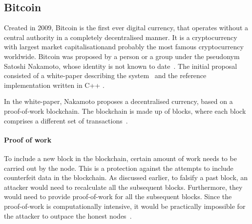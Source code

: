 \subsection{Bitcoin}
% 
Created in 2009, Bitcoin is the first ever digital currency, that operates without a central authority in a completely decentralised manner. It is a cryptocurrency with largest market capitalisation\footnotemark and probably the most famous cryptocurrency worldwide.
% 
% 
Bitcoin was proposed by a person or a group under the pseudonym Satoshi Nakamoto, whose identity is not known to date~\cite{Feins2017SatoshiBitcoin}. The initial proposal consisted of a white-paper describing the system~\cite{NakamotoBitcoin:System} and the reference implementation written in  C++ \footnotemark.
% 

In the white-paper, Nakamoto proposes a decentralised currency, based on a proof-of-work blockchain. The blockchain is made up of blocks, where each block comprises a different set of transactions~\cite{Decker2013InformationNetwork, Judmayer2017BlocksMechanisms}.

\paragraph{Proof of work}
To include a new block in the blockchain, certain amount of work needs to be carried out by the node. This is a protection against the attempts to include counterfeit data in the blockchain. As discussed earlier, to falsify a past block, an attacker would need to recalculate all the subsequent blocks. Furthermore, they would need to provide proof-of-work for all the subsequent blocks. Since the proof-of-work is computationally intensive, it would be practically impossible for the attacker to outpace the honest nodes~\cite{NakamotoBitcoin:System}.

